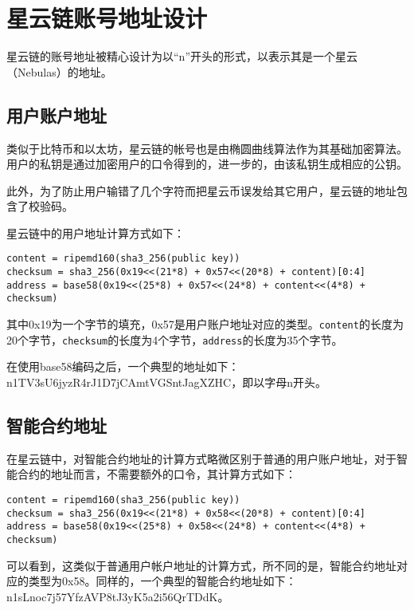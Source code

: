 \section{星云链账号地址设计}
星云链的账号地址被精心设计为以``n''开头的形式，以表示其是一个星云（Nebulas）的地址。

\subsection{用户账户地址}
类似于比特币和以太坊，星云链的帐号也是由椭圆曲线算法作为其基础加密算法。
用户的私钥是通过加密用户的口令得到的，进一步的，由该私钥生成相应的公钥。


此外，为了防止用户输错了几个字符而把星云币误发给其它用户，星云链的地址包含了校验码。

星云链中的用户地址计算方式如下：

\begin{verbatim}
content = ripemd160(sha3_256(public key))
checksum = sha3_256(0x19<<(21*8) + 0x57<<(20*8) + content)[0:4]
address = base58(0x19<<(25*8) + 0x57<<(24*8) + content<<(4*8) + checksum)
\end{verbatim}
其中0x19为一个字节的填充，0x57是用户账户地址对应的类型。\texttt{content}的长度为20个字节，\texttt{checksum}的长度为4个字节，\texttt{address}的长度为35个字节。

在使用base58编码之后，一个典型的地址如下：n1TV3sU6jyzR4rJ1D7jCAmtVGSntJagXZHC，即以字母n开头。



\subsection{智能合约地址}
在星云链中，对智能合约地址的计算方式略微区别于普通的用户账户地址，对于智能合约的地址而言，不需要额外的口令，其计算方式如下：

\begin{verbatim}
content = ripemd160(sha3_256(public key))
checksum = sha3_256(0x19<<(21*8) + 0x58<<(20*8) + content)[0:4]
address = base58(0x19<<(25*8) + 0x58<<(24*8) + content<<(4*8) + checksum)
\end{verbatim}
\noindent
可以看到，这类似于普通用户帐户地址的计算方式，所不同的是，智能合约地址对应的类型为0x58。同样的，一个典型的智能合约地址如下：
n1sLnoc7j57YfzAVP8tJ3yK5a2i56QrTDdK。

